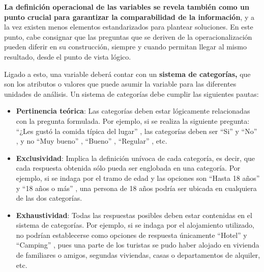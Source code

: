 \documentclass[
]{book}
\begin{document}
\hfill\break
\textbf{La definición operacional de las variables se revela también como un punto crucial para garantizar la comparabilidad de la información}, y a la vez existen menos elementos estandarizados para plantear soluciones. En este punto, cabe consignar que las preguntas que se deriven de la operacionalización pueden diferir en su construcción, siempre y cuando permitan llegar al mismo resultado, desde el punto de vista lógico.

Ligado a esto, una variable deberá contar con un \textbf{sistema de categorías,} que son los atributos o valores que puede asumir la variable para las diferentes unidades de análisis. Un sistema de categorías debe cumplir las siguientes pautas:

\begin{itemize}
\item
  \textbf{Pertinencia teórica}: Las categorías deben estar lógicamente relacionadas con la pregunta formulada. Por ejemplo, si se realiza la siguiente pregunta: ``¿Les gustó la comida típica del lugar'' , las categorías deben ser ``Si'' y ``No'' , y no ``Muy bueno'' , ``Bueno'' , ``Regular'' , etc.
\item
  \textbf{Exclusividad}: Implica la definición unívoca de cada categoría, es decir, que cada respuesta obtenida sólo pueda ser englobada en una categoría. Por ejemplo, si se indaga por el tramo de edad y las opciones son ``Hasta 18 años'' y ``18 años o más'' , una persona de 18 años podría ser ubicada en cualquiera de las dos categorías.
\item
  \textbf{Exhaustividad}: Todas las respuestas posibles deben estar contenidas en el sistema de categorías. Por ejemplo, si se indaga por el alojamiento utilizado, no podrían establecerse como opciones de respuesta únicamente ``Hotel'' y ``Camping'' , pues una parte de los turistas se pudo haber alojado en vivienda de familiares o amigos, segundas viviendas, casas o departamentos de alquiler, etc.
\end{itemize}
\end{document}
